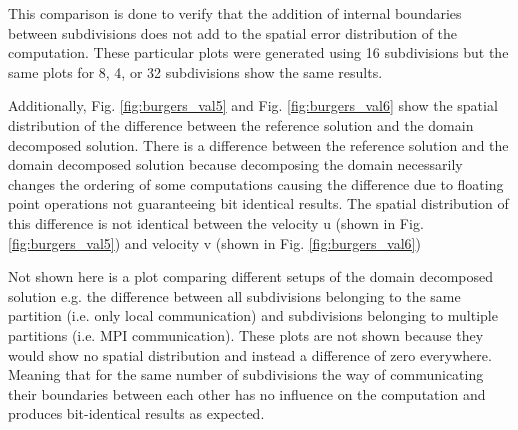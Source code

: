 This comparison is done to verify that the addition of internal boundaries between subdivisions does not add to the spatial error distribution of the computation.
These particular plots were generated using 16 subdivisions but the same plots for 8, 4, or 32 subdivisions show the same results.

Additionally, Fig. \ref{fig:burgers_val5} and Fig. \ref{fig:burgers_val6} show the spatial distribution of the difference between the reference solution and the domain decomposed solution.
There is a difference between the reference solution and the domain decomposed solution because decomposing the domain necessarily changes the ordering of some computations causing the difference due to floating point operations not guaranteeing bit identical results.
The spatial distribution of this difference is not identical between the velocity u (shown in Fig. \ref{fig:burgers_val5}) and velocity v (shown in Fig. \ref{fig:burgers_val6})

Not shown here is a plot comparing different setups of the domain decomposed solution e.g. the difference between all subdivisions belonging to the same partition (i.e. only local communication) and subdivisions belonging to multiple partitions (i.e. MPI communication).
These plots are not shown because they would show no spatial distribution and instead a difference of zero everywhere.
Meaning that for the same number of subdivisions the way of communicating their boundaries between each other has no influence on the computation and produces bit-identical results as expected.

